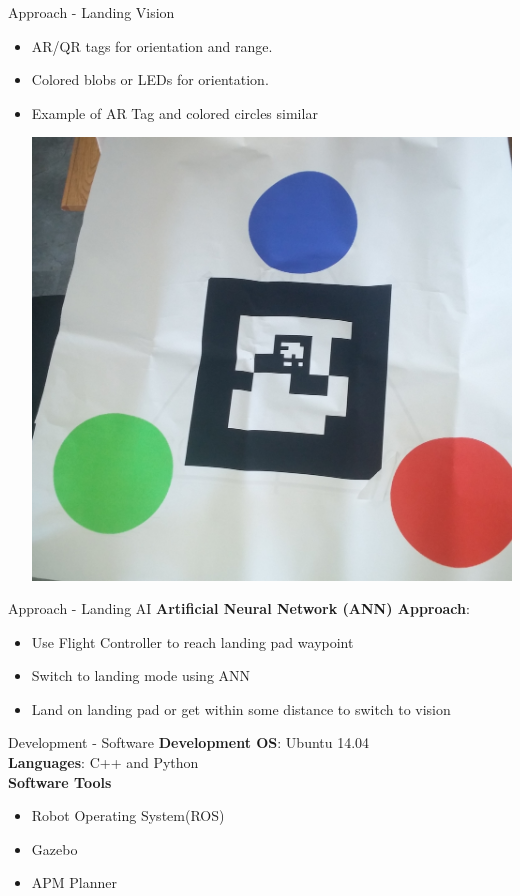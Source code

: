 \documentclass[11pt]{beamer}
\begin{document}
\begin{frame}{Approach - Landing Vision}
\begin{itemize}
	\item AR/QR tags for orientation and range.
	\item Colored blobs or LEDs for orientation.
	\item Example of AR Tag and colored circles similar
	\centerline{\includegraphics[scale=0.07]{images/example_pad_target.jpg}}
\end{itemize}
\end{frame}

\begin{frame}{Approach - Landing AI}
\textbf{Artificial Neural Network (ANN) Approach}:
\begin{itemize}
\item Use Flight Controller to reach landing pad waypoint
\item Switch to landing mode using ANN
\item Land on landing pad or get within some distance to switch to vision
\end{itemize}
\end{frame}


\begin{frame}{Development - Software}
\textbf{Development OS}: Ubuntu 14.04\\
\textbf{Languages}: C++ and Python\\
\vspace{5mm}
\textbf{Software Tools}
\begin{itemize}
\item Robot Operating System(ROS)
\item Gazebo
\item APM Planner
\end{itemize}
\end{frame}
\end{document}
